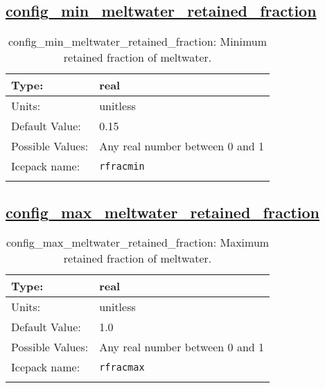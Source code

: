 \subsection[config\_min\_meltwater\_retained\_fraction]{\hyperref[sec:nm_tab_meltponds]{config\_min\_meltwater\_retained\_fraction}}
\label{subsec:nm_sec_config_min_meltwater_retained_fraction}
\begin{center}
\begin{longtable}{| p{2.0in} || p{4.0in} |}
    \hline
    Type: & real \\
    \hline
    Units: & \si{unitless} \\
    \hline
    Default Value: & 0.15 \\
    \hline
    Possible Values: & Any real number between 0 and 1 \\
    \hline
    \hline
    Icepack name: & \verb+rfracmin+ \\
    \caption{config\_min\_meltwater\_retained\_fraction: Minimum retained fraction of meltwater.}
\end{longtable}
\end{center}
\subsection[config\_max\_meltwater\_retained\_fraction]{\hyperref[sec:nm_tab_meltponds]{config\_max\_meltwater\_retained\_fraction}}
\label{subsec:nm_sec_config_max_meltwater_retained_fraction}
\begin{center}
\begin{longtable}{| p{2.0in} || p{4.0in} |}
    \hline
    Type: & real \\
    \hline
    Units: & \si{unitless} \\
    \hline
    Default Value: & 1.0 \\
    \hline
    Possible Values: & Any real number between 0 and 1 \\
    \hline
    \hline
    Icepack name: & \verb+rfracmax+ \\
    \caption{config\_max\_meltwater\_retained\_fraction: Maximum retained fraction of meltwater.}
\end{longtable}
\end{center}
